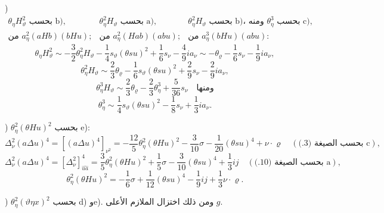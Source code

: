 \documentclass[11pt]{article}
\providecommand{\A}{\Delta}
\begin{document}
)
\[
\begin{array}{ccc}
\theta_\eta H_\vartheta^2\text{ بحسب b)},&
\theta_\eta^2H_\vartheta\text{ بحسب a)},&
\theta_\eta^2H_\vartheta\text{ بحسب b)، ومنه }\theta_\eta^3\text{ بحسب c)},\\
\text{من }a_\eta^2(aHb)(bHu);&
\text{من }a_\eta^2(Hab)(abu);&
\text{من }a_\eta^3(bHu)(abu):
\end{array}
\]
\[
\theta_\eta H_\vartheta^2\sim-\frac32\theta_\eta^2H_\vartheta-\frac14s_\vartheta(\theta su)^2+\frac16s_\nu-\frac49ia_\nu
\sim-\theta_\varrho-\frac16s_\nu-\frac19ia_\nu,
\]
\[
\theta_\eta^2H_\vartheta\sim\frac23\theta_\varrho-\frac16s_\vartheta(\theta su)^2+\frac29s_\nu-\frac29ia_\nu,
\]
\[
\theta_\eta^3H_\vartheta\sim\frac23\theta_\varrho-\frac23\theta_\eta^3+\frac5{36}s_\nu\quad\text{ومنها}
\]
\[
\theta_\eta^3\sim\frac14s_\vartheta(\theta su)^2-\frac18s_\nu+\frac13ia_\nu.
\]

) $\theta_\eta^2(\theta Hu)^2$ بحسب e):
\[
\A_\nu^2(a\A u)^4=[(a\A u)^4]_{\nu^2}=-\frac{12}{5}\theta_\eta^2(\theta Hu)^2-\frac3{10}\sigma-\frac1{20}(\theta su)^4+\nu\cdot\varrho
\quad(\text{بحسب الصيغة (3.) c}),
\]
\[
\A_\nu^2(a\A u)^4=[\A_\nu^2]^4_{\widehat{u a}}=\frac35\theta_\eta^2(\theta Hu)^2+\frac15\sigma-\frac3{10}(\theta su)^4+\frac13ij
\quad(\text{بحسب الصيغة (10.) a}),
\]
\[
\theta_\eta^2(\theta Hu)^2=-\frac16\sigma+\frac1{12}(\theta su)^4-\frac19ij+\frac13\nu\cdot\varrho.
\]

) $\theta_\eta^2(\vartheta\eta x)^2$ بحسب d) وe). ومن ذلك اختزال الملازم الأعلى $g$.
\end{document}
